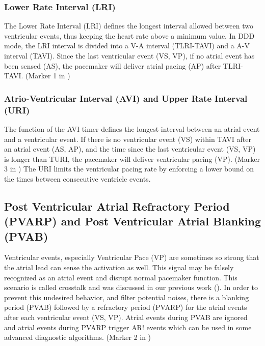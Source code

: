 \subsubsection{Lower Rate Interval (LRI)}
The Lower Rate Interval (LRI) defines the longest interval allowed between two ventricular events, thus keeping the heart rate above a minimum value. 
In DDD mode, the LRI interval is divided into a V-A interval (TLRI-TAVI) and a A-V interval (TAVI). 
Since the last ventricular event \textsf{(VS, VP)}, if no atrial event has been sensed \textsf{(AS)}, the pacemaker will deliver atrial pacing \textsf{(AP)} after TLRI-TAVI. (Marker 1 in )

\subsubsection{Atrio-Ventricular Interval (AVI) and Upper Rate Interval (URI)}
The function of the AVI timer defines the longest interval between an atrial event and a ventricular event. 
If there is no ventricular event \textsf{(VS)} within TAVI after an atrial event \textsf{(AS, AP)}, and the time since the last ventricular event \textsf{(VS, VP)} is longer than TURI, the pacemaker will deliver ventricular pacing \textsf{(VP)}. (Marker 3 in )
The URI limits the ventricular pacing rate by enforcing a lower bound on the times between consecutive ventricle events. %

\subsection{Post Ventricular Atrial Refractory Period (PVARP) and Post Ventricular Atrial Blanking (PVAB)}
Ventricular events, especially Ventricular Pace \textsf{(VP)} are sometimes so strong that the atrial lead can sense the activation as well. 
This signal may be falsely recognized as an atrial event and disrupt normal pacemaker function. 
This scenario is called crosstalk and was discussed in our previous work (\cite{vhm_embc11}). 
In order to prevent this undesired behavior, and filter potential noises, there is a blanking period (PVAB) followed by a refractory period (PVARP) for the atrial events after each ventricular event \textsf{(VS, VP)}. 
Atrial events during PVAB are ignored and atrial events during PVARP trigger \textsf{AR!} events which can be used in some advanced diagnostic algorithms. (Marker 2 in )

